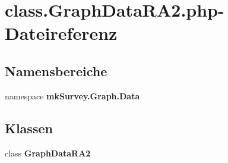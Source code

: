 \section{class.GraphDataRA2.php-Dateireferenz}
\label{class_8GraphDataRA2_8php}
\subsection*{Namensbereiche}
\begin{CompactItemize}
\item 
namespace {\bf mkSurvey.Graph.Data}
\end{CompactItemize}
\subsection*{Klassen}
\begin{CompactItemize}
\item 
class {\bf GraphDataRA2}
\end{CompactItemize}
